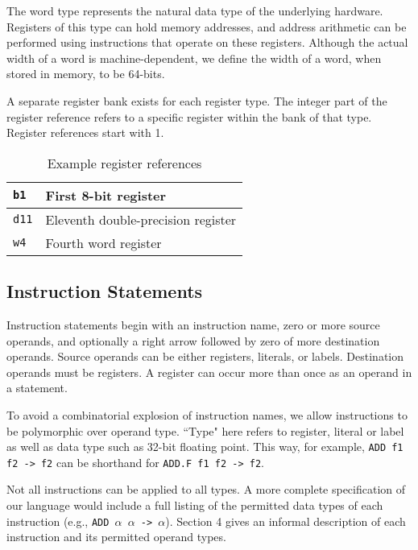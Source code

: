 The word type represents the natural data type of the underlying hardware.
Registers of this type can hold memory addresses, and address arithmetic
can be performed using instructions that operate on these registers.
Although the actual width of a word is machine-dependent,
we define the width of a word, when stored in memory, to be 64-bits.

A separate register bank exists for each register type. The integer
part of the register reference refers to a specific register
within the bank of that type. Register references start with 1.

\begin{table}[h!]
  \begin{center}
    \begin{tabular}{|l|l|}
      \hline
      \texttt{b1}  & First 8-bit register               \\ \hline
      \texttt{d11} & Eleventh double-precision register \\ \hline
      \texttt{w4}  & Fourth word register               \\ \hline
    \end{tabular}
  \end{center}
  \caption{Example register references}
\end{table}

\subsection{Instruction Statements}

Instruction statements begin with an instruction name, zero or
more source operands, and optionally a right arrow followed by
zero of more destination operands. Source operands can be either registers,
literals, or labels. Destination operands must be registers.
A register can occur more than once as an operand in a statement.

To avoid a combinatorial explosion of instruction names,
we allow instructions to be polymorphic over operand type.
``Type" here refers to register, literal or label as well
as data type such as 32-bit floating point.
This way, for example, \texttt{ADD f1 f2 -> f2} can be shorthand
for \texttt{ADD.F f1 f2 -> f2}.

Not all instructions can be applied to all types.
A more complete specification of our language would include
a full listing of the permitted data types of each instruction
(e.g., \texttt{ADD $\alpha$ $\alpha$ -> $\alpha$}). Section 4 gives an informal description of each instruction
and its permitted operand types.

